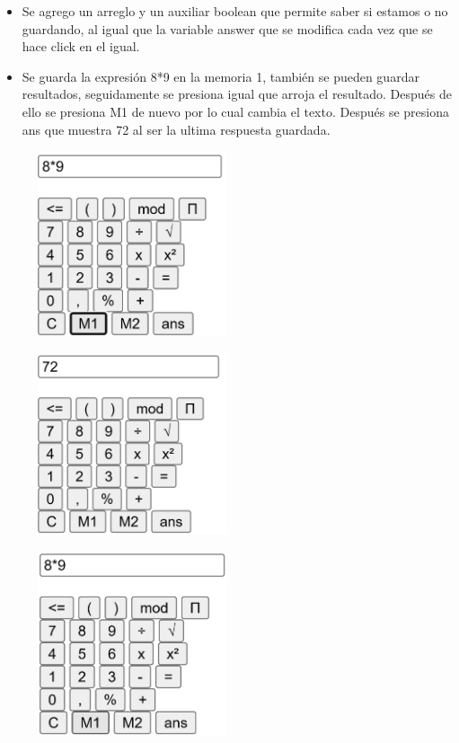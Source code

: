 \documentclass{article}
\begin{document}
	\begin{itemize}	
		\item Se agrego un arreglo y un auxiliar boolean que permite saber si estamos o no guardando, 
		al igual que la variable answer que se modifica cada vez que se hace click en el igual.
	\end{itemize}
	
	\begin{itemize}	
		\item Se guarda la expresión 8*9 en la memoria 1, también se pueden guardar resultados, seguidamente
		se presiona igual que arroja el resultado. Después de ello se presiona M1 de nuevo por lo cual cambia 
		el texto. Después se presiona ans que muestra 72 al ser la ultima respuesta guardada.
	\end{itemize}
	\begin{figure}[H]
		\centering
		\includegraphics[width=0.5\textwidth,keepaspectratio]{img/calc04.png}
	\end{figure}
	\begin{figure}[H]
		\centering
		\includegraphics[width=0.5\textwidth,keepaspectratio]{img/calc05.png}
	\end{figure}
	\begin{figure}[H]
		\centering
		\includegraphics[width=0.5\textwidth,keepaspectratio]{img/calc06.png}
	\end{figure}
\end{document}
